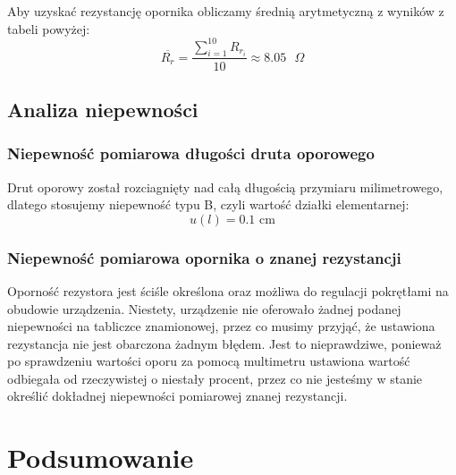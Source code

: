 \documentclass[a4paper,12pts]{article}
\begin{document}
	Aby uzyskać rezystancję opornika obliczamy średnią arytmetyczną z wyników z tabeli powyżej:
	\begin{equation}
	\overline{R_{r}} = \frac{\sum_{i = 1}^{10} R_{{r}_i}}{10} \approx 8.05 \textrm{ $\Omega$}
	\end{equation}
	
	
	\subsection{Analiza niepewności}
	
	\subsubsection{Niepewność pomiarowa długości druta oporowego}
	
	Drut oporowy został rozciagnięty nad całą długością przymiaru milimetrowego, dlatego stosujemy niepewność typu B, czyli wartość działki elementarnej:
	\begin{equation}
		u(l) = 0.1 \textrm{ cm}
	\end{equation}
	
	
	\subsubsection{Niepewność pomiarowa opornika o znanej rezystancji}
	
	Oporność rezystora jest ściśle określona oraz możliwa do regulacji pokrętłami na obudowie urządzenia. Niestety, urządzenie nie oferowało żadnej podanej niepewności na tabliczce znamionowej, przez co musimy przyjąć, że ustawiona rezystancja nie jest obarczona żadnym błędem. Jest to nieprawdziwe, ponieważ po sprawdzeniu wartości oporu za pomocą multimetru ustawiona wartość odbiegała od rzeczywistej o niestały procent, przez co nie jesteśmy w stanie określić dokładnej niepewności pomiarowej znanej rezystancji.
	

	\section{Podsumowanie}

\end{document}
